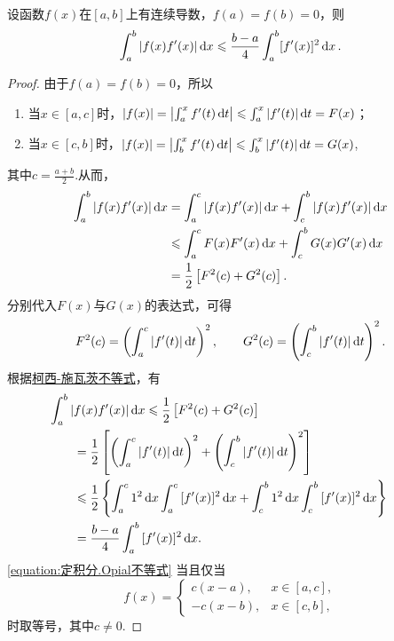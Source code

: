 \begin{theorem}\label{theorem:定积分.欧庇尔不等式}
设函数\(f(x)\)在\([a,b]\)上有连续导数，\(f(a)=f(b)=0\)，则\begin{equation}\label{equation:定积分.Opial不等式}
\int_a^b \abs{f(x) f'(x)} \dd{x}
\leqslant \frac{b-a}{4}
\int_a^b [f'(x)]^2 \dd{x}.
\end{equation}
\begin{proof}
由于\(f(a)=f(b)=0\)，所以\begin{enumerate}
\item 当\(x \in \left[a,c\right]\)时，\(\abs{f(x)} = \abs{\int_a^x f'(t) \dd{t}} \leqslant \int_a^x \abs{f'(t)} \dd{t} = F(x)\)；
\item 当\(x \in \left[c,b\right]\)时，\(\abs{f(x)} = \abs{\int_b^x f'(t) \dd{t}} \leqslant \int_b^x \abs{f'(t)} \dd{t} = G(x)\),
\end{enumerate}其中\(c=\frac{a+b}{2}\).从而，\begin{align*}
\int_a^b \abs{f(x) f'(x)} \dd{x}
&= \int_a^c \abs{f(x) f'(x)} \dd{x}
    + \int_c^b \abs{f(x) f'(x)} \dd{x} \\
&\leqslant \int_a^c F(x) F'(x) \dd{x}
    + \int_c^b G(x) G'(x) \dd{x} \\
&= \frac{1}{2} \left[ F^2(c) + G^2(c) \right].
\end{align*}分别代入\(F(x)\)与\(G(x)\)的表达式，可得\[
F^2(c) = \left( \int_a^c \abs{f'(t)} \dd{t} \right)^2,
\qquad
G^2(c) = \left( \int_c^b \abs{f'(t)} \dd{t} \right)^2.
\]根据\hyperref[equation:定积分.柯西-施瓦茨不等式]{柯西-施瓦茨不等式}，有\begin{align*}
&\hspace{-20pt}\int_a^b{\abs{f(x) f'(x)} \dd{x}}
\leqslant \frac{1}{2} \left[
    F^2(c)
    + G^2(c)
    \right] \\
&= \frac{1}{2} \left[
    \left(\int_a^c{\abs{f'(t)}\dd{t}}\right)^2
    +\left(\int_c^b{\abs{f'(t)}\dd{t}}\right)^2
    \right] \\
&\leqslant \frac{1}{2} \left\{
    \int_a^c{1^2 \dd{x}}
    \int_a^c{[f'(x)]^2 \dd{x}}
    +\int_c^b{1^2 \dd{x}}
    \int_c^b{[f'(x)]^2 \dd{x}}
    \right\} \\
&= \frac{b-a}{4} \int_a^b{[f'(x)]^2 \dd{x}}.
\end{align*}
\cref{equation:定积分.Opial不等式} 当且仅当\[
f(x) = \left\{ \begin{array}{cl}
c(x-a), & x\in\left[a,c\right], \\
-c(x-b), & x\in\left[c,b\right],
\end{array} \right.
\]时取等号，其中\(c\neq0\).
\end{proof}
\end{theorem}

